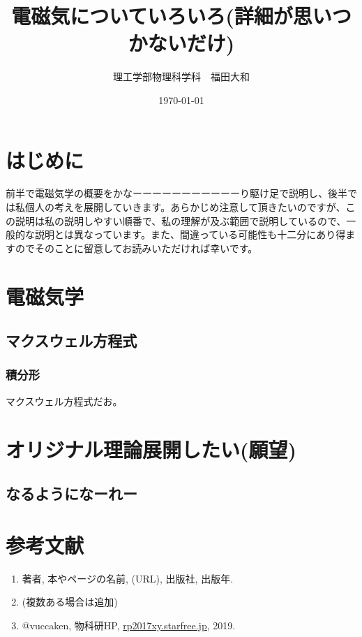 \documentclass[11pt,b5paper,papersize,dvipdfmx]{jsarticle}
\title{電磁気についていろいろ(詳細が思いつかないだけ)} %
\author{理工学部物理科学科　福田大和} %
\date{\today} %
\begin{document}
\maketitle %
\setcounter{tocdepth}{2} %
\tableofcontents %

\clearpage %

\section*{はじめに}
前半で電磁気学の概要をかなーーーーーーーーーーーり駆け足で説明し、後半では私個人の考えを展開していきます。あらかじめ注意して頂きたいのですが、この説明は私の説明しやすい順番で、私の理解が及ぶ範囲で説明しているので、一般的な説明とは異なっています。また、間違っている可能性も十二分にあり得ますのでそのことに留意してお読みいただければ幸いです。

\section{電磁気学}
\subsection{マクスウェル方程式}
\subsubsection{積分形}
マクスウェル方程式だお。
\section{オリジナル理論展開したい(願望)}
\subsection{なるようになーれー}

\section*{参考文献}
\renewcommand{\labelenumi}{[\arabic{enumi}]} %
\begin{enumerate}
\item 著者, 本やページの名前, (URL), 出版社, 出版年.
\item (複数ある場合は追加)
\item @vuccaken, 物科研HP, \url{rp2017xy.starfree.jp}, 2019.
\end{enumerate}
\renewcommand{\labelenumi}{\arabic{enumi}.} %
\end{document}
